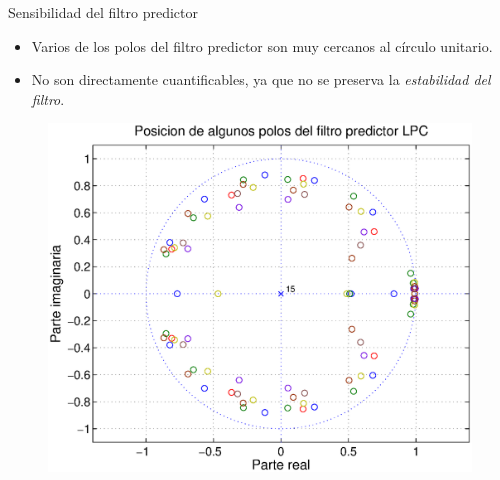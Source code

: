 \documentclass[xcolor=table]{beamer}
\begin{document}
\begin{frame}{Sensibilidad del filtro predictor}
	\begin{itemize}
		\item<2-> Varios de los polos del filtro predictor son muy cercanos al c\'irculo unitario. 
		\item<3-> No son directamente cuantificables, ya que no se preserva la \emph{estabilidad del filtro}.
	\end{itemize}\pause
	\begin{figure}
		\centering
		\includegraphics[scale=0.35]{polos_y_ceros.eps}
	\end{figure}	
\end{frame}
\end{document}
